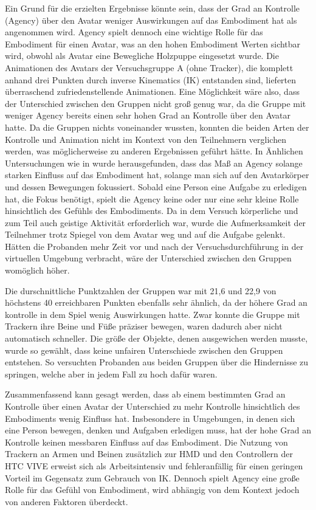 Ein Grund für die erzielten Ergebnisse könnte sein, dass der Grad an Kontrolle (Agency) über den Avatar weniger Auswirkungen auf das Embodiment hat als angenommen wird. Agency spielt dennoch eine wichtige Rolle für das Embodiment für einen Avatar, was an den hohen Embodiment Werten sichtbar wird, obwohl als Avatar eine Bewegliche Holzpuppe eingesetzt wurde. Die Animationen des Avatars der Versuchsgruppe A (ohne Tracker), die komplett anhand drei Punkten durch inverse Kinematics (IK) entstanden sind, lieferten überraschend zufriedenstellende Animationen. Eine Möglichkeit wäre also, dass der Unterschied zwischen den Gruppen nicht groß genug war, da die Gruppe mit weniger Agency bereits einen sehr hohen Grad an Kontrolle über den Avatar hatte. Da die Gruppen nichts voneinander wussten, konnten die beiden Arten der Kontrolle und Animation nicht im Kontext von den Teilnehmern verglichen werden, was möglicherweise zu anderen Ergebnissen geführt hätte.
In Änhlichen Untersuchungen wie in \cite{Koilias2019} wurde herausgefunden, dass das Maß an Agency solange starken Einfluss auf das Embodiment hat, solange man sich auf den Avatarkörper und dessen Bewegungen fokussiert. Sobald eine Person eine Aufgabe zu erledigen hat, die Fokus benötigt,  spielt die Agency keine oder nur eine sehr kleine Rolle hinsichtlich des Gefühls des Embodiments. Da in dem Versuch körperliche und zum Teil auch geistige Aktivität erforderlich war, wurde die Aufmerksamkeit der Teilnehmer trotz Spiegel von dem Avatar weg und auf die Aufgabe gelenkt. Hätten die Probanden mehr Zeit vor und nach der Versuchsdurchführung in der virtuellen Umgebung verbracht, wäre der Unterschied zwischen den Gruppen womöglich höher.


Die durschnittliche Punktzahlen der Gruppen war mit 21,6 und 22,9 von höchstens 40 erreichbaren Punkten ebenfalls sehr ähnlich, da der höhere Grad an kontrolle in dem Spiel wenig Auswirkungen hatte. Zwar konnte die Gruppe mit Trackern ihre Beine und Füße präziser bewegen, waren dadurch aber nicht automatisch schneller. Die größe der Objekte, denen ausgewichen werden musste, wurde so gewählt, dass keine unfairen Unterschiede zwischen den Gruppen entstehen. So versuchten Probanden aus beiden Gruppen über die Hindernisse zu springen, welche aber in jedem Fall zu hoch dafür waren.


Zusammenfassend kann gesagt werden, dass ab einem bestimmten Grad an Kontrolle über einen Avatar der Unterschied zu mehr Kontrolle hinsichtlich des Embodiments wenig Einfluss hat. Insbesondere in Umgebungen, in denen sich eine Person bewegen, denken und Aufgaben erledigen muss, hat der hohe Grad an Kontrolle keinen messbaren Einfluss auf das Embodiment. Die Nutzung von Trackern an Armen und Beinen zusätzlich zur HMD und den Controllern der HTC VIVE erweist sich als Arbeitsintensiv und fehleranfällig für einen geringen Vorteil im Gegensatz zum Gebrauch von IK. Dennoch spielt Agency eine große Rolle für das Gefühl von Embodiment, wird abhängig von dem Kontext jedoch von anderen Faktoren überdeckt.


